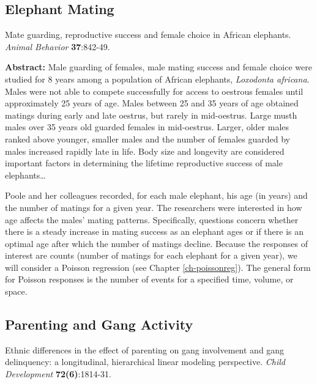 \documentclass[
]{krantz}
\renewenvironment{quote}{\begin{VF}}{\end{VF}}
\begin{document}
\subsection{Elephant Mating}\label{elephant-mating}

\citet{Poole1989} Mate guarding, reproductive success and female choice in African elephants. \emph{Animal Behavior} \textbf{37}:842-49.

\begin{quote}
\textbf{Abstract:} Male guarding of females, male mating success and female choice were studied for 8 years among a population of African elephants, \emph{Loxodonta africana}. Males were not able to compete successfully for access to oestrous females until approximately 25 years of age. Males between 25 and 35 years of age obtained matings during early and late oestrus, but rarely in mid-oestrus. Large musth males over 35 years old guarded females in mid-oestrus. Larger, older males ranked above younger, smaller males and the number of females guarded by males increased rapidly late in life. Body size and longevity are considered important factors in determining the lifetime reproductive success of male elephants\ldots{}
\end{quote}

Poole and her colleagues recorded, for each male elephant, his age (in years) and the number of matings for a given year. The researchers were interested in how age affects the males' mating patterns. Specifically, questions concern whether there is a steady increase in mating success as an elephant ages or if there is an optimal age after which the number of matings decline. Because the responses of interest are counts (number of matings for each elephant for a given year), we will consider a Poisson regression (see Chapter \ref{ch-poissonreg}). The general form for Poisson responses is the number of events for a specified time, volume, or space.

\subsection{Parenting and Gang Activity}\label{parenting-and-gang-activity}

\citet{Walker-Barnes2001} Ethnic differences in the effect of parenting on gang involvement and gang delinquency: a longitudinal, hierarchical linear modeling perspective. \emph{Child Development} \textbf{72(6)}:1814-31.
\end{document}

